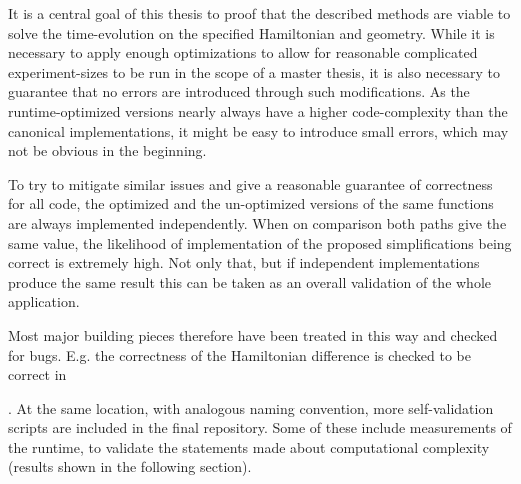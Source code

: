 It is a central goal of this thesis to proof that the described methods are viable to solve the time-evolution on the specified Hamiltonian and geometry.
While it is necessary to apply enough optimizations to allow for reasonable complicated experiment-sizes to be run in the scope of a master thesis, it is also necessary to guarantee that no errors are introduced through such modifications.
As the runtime-optimized versions nearly always have a higher code-complexity than the canonical implementations, it might be easy to introduce small errors, which may not be obvious in the beginning.

To try to mitigate similar issues and give a reasonable guarantee of correctness for all code, the optimized and the un-optimized versions of the same functions are always implemented independently.
When on comparison both paths give the same value, the likelihood of implementation of the proposed simplifications being correct is extremely high.
Not only that, but if independent implementations produce the same result this can be taken as an overall validation of the whole application.

Most major building pieces therefore have been treated in this way and checked for bugs.
E.g. the correctness of the Hamiltonian difference is checked to be correct in 

.
At the same location, with analogous naming convention, more self-validation scripts are included in the final repository.
Some of these include measurements of the runtime, to validate the statements made about computational complexity (results shown in the following section).
